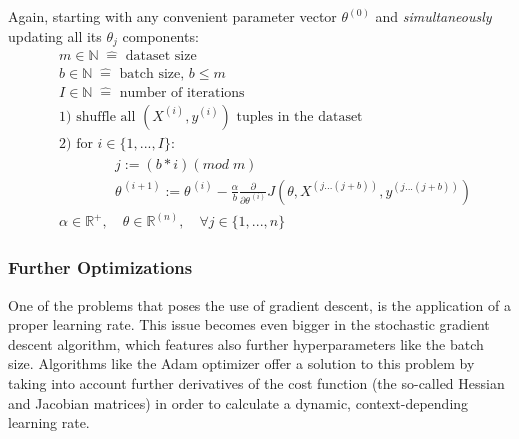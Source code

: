 Again, starting with any convenient parameter vector \(\theta^{(0)}\) and {\it simultaneously} updating all its \(\theta_j\) components:
\begin{equation*}
  \begin{aligned}
    & m \in \mathbb{N}\;\hat{=} \text{ dataset size}\\
    & b \in \mathbb{N}\;\hat{=} \text{ batch size, } b\leq m\\
    & I \in \mathbb{N}\;\hat{=} \text{ number of iterations}\\[5mm]
    & \text{1) shuffle all } (X^{(i)}, y^{(i)}) \text{ tuples in the dataset}\\[2mm]
    & \text{2) for } i \in \{1, ..., I\} \text{:}\\[5mm]
    & \qquad \qquad j := (b*i)(mod\;m)\\
    & \qquad \qquad \theta^{\,(i+1)} :=  \theta^{\,(i)}-\frac{\alpha}{b}\frac{\partial}{\partial\theta^{\,(i)}}J(\theta, X^{(j...(j+b))}, y^{(j...(j+b))})  \\[3mm]
    & \alpha \in \mathbb{R}^+, \quad \theta  \in \mathbb{R}^{(n)}, \quad  \forall j \in \{1, ...,  n\}
  \end{aligned}
\end{equation*}


\subsubsection{Further Optimizations}

One of the problems that poses the use of gradient descent, is the application of a proper learning rate. This issue becomes even bigger in the stochastic gradient descent algorithm, which features also further hyperparameters like the batch size. Algorithms like the Adam optimizer\cite{adam} offer a solution to this problem by taking into account further derivatives of the cost function (the so-called Hessian and Jacobian matrices) in order to calculate a dynamic, context-depending learning rate.






